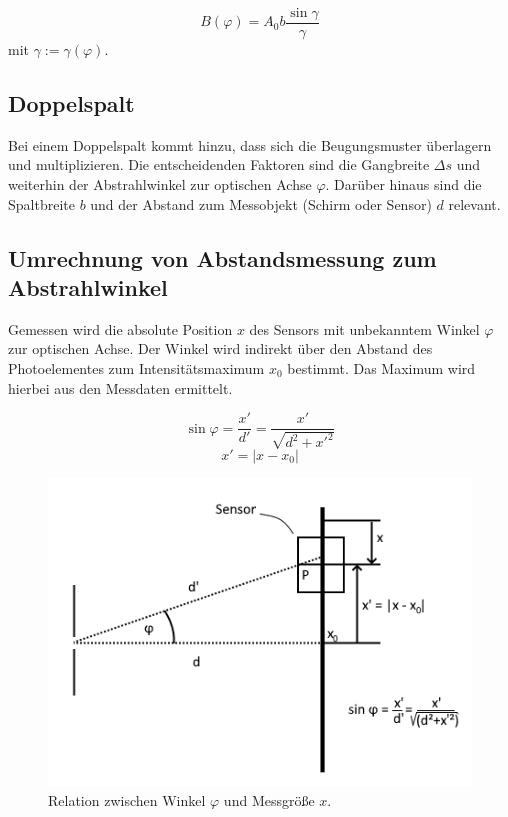 \begin{equation}
  B(\varphi) = A_0b\frac{\sin{\gamma}}{\gamma}
\end{equation}
mit $\gamma := \gamma(\varphi)$.

\subsection{Doppelspalt}
Bei einem Doppelspalt kommt hinzu, dass sich die Beugungsmuster überlagern und multiplizieren.
Die entscheidenden Faktoren sind die Gangbreite $\Delta s$ und weiterhin der Abstrahlwinkel zur optischen Achse $\varphi$.
Darüber hinaus sind die Spaltbreite $b$ und der Abstand zum Messobjekt (Schirm oder Sensor) $d$ relevant.

\subsection{Umrechnung von Abstandsmessung zum Abstrahlwinkel}
Gemessen wird die absolute Position $x$ des Sensors mit unbekanntem Winkel $\varphi$ zur optischen Achse.
Der Winkel wird indirekt über den Abstand des Photoelementes zum Intensitätsmaximum $x_0$ bestimmt.
Das Maximum wird hierbei aus den Messdaten ermittelt.

\begin{equation}
  \sin{\varphi} = \frac{x'}{d'} = \frac{x'}{\sqrt{d^2+x'^2}}
\end{equation}
\begin{equation}
  x' = |x-x_0|
\end{equation}

\begin{figure}
  \centering
  \includegraphics[width=.8\textwidth]{plots/x_to_angle.png}
  \caption{Relation zwischen Winkel $\varphi$ und Messgröße $x$.}
  \label{fig:xToAngle}
\end{figure}